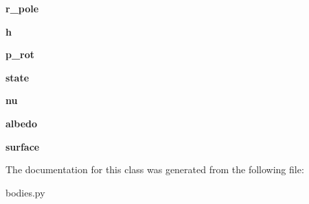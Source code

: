\begin{DoxyCompactItemize}
{\bfseries r\+\_\+pole}
\item 
\mbox{\label{classbodies_1_1body_a1c81cf3eb29040093776314ca03632d7}} 
{\bfseries h}
\item 
\mbox{\label{classbodies_1_1body_ae0b67b8d90f56a27f9eaa2ca1910e9d7}} 
{\bfseries p\+\_\+rot}
\item 
\mbox{\label{classbodies_1_1body_a2214b424771ecceac90b9ddefacc536d}} 
{\bfseries state}
\item 
\mbox{\label{classbodies_1_1body_a903e47f0cb600c373c0d0dba8fd1e132}} 
{\bfseries nu}
\item 
\mbox{\label{classbodies_1_1body_a82f2c351ce43949ddc993a3a36e950d8}} 
{\bfseries albedo}
\item 
\mbox{\label{classbodies_1_1body_af0dfae66f6843d52da74415340e3df64}} 
{\bfseries surface}
\end{DoxyCompactItemize}


The documentation for this class was generated from the following file\+:\begin{DoxyCompactItemize}
\item 
bodies.\+py\end{DoxyCompactItemize}

